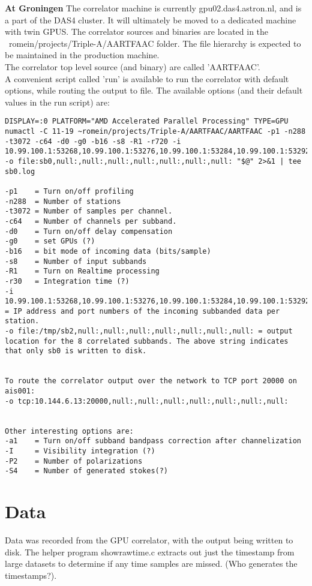 \documentclass {article}
\begin{document}
\textbf {At Groningen} The correlator machine is currently gpu02.das4.astron.nl,
and is a part  of the DAS4 cluster.  It will ultimately  be moved to a dedicated
machine with twin  GPUS. The correlator sources and binaries  are located in the
~romein/projects/Triple-A/AARTFAAC folder.  The file hierarchy is expected to be
maintained in  the production  machine.\\ The correlator  top level  source (and
binary) are called  'AARTFAAC'.\\ A convenient script called  'run' is available
to  run  the  correlator with  default  options,  while  routing the  output  to
file. The  available options (and  their default values in the run script) are:
\begin{verbatim}
DISPLAY=:0 PLATFORM="AMD Accelerated Parallel Processing" TYPE=GPU numactl -C 11-19 ~romein/projects/Triple-A/AARTFAAC/AARTFAAC -p1 -n288 -t3072 -c64 -d0 -g0 -b16 -s8 -R1 -r720 -i 10.99.100.1:53268,10.99.100.1:53276,10.99.100.1:53284,10.99.100.1:53292,10.99.100.1:53300,10.99.100.1:53308 -o file:sb0,null:,null:,null:,null:,null:,null:,null: "$@" 2>&1 | tee sb0.log

-p1    = Turn on/off profiling
-n288  = Number of stations
-t3072 = Number of samples per channel.
-c64   = Number of channels per subband.
-d0    = Turn on/off delay compensation
-g0    = set GPUs (?)
-b16   = bit mode of incoming data (bits/sample)
-s8    = Number of input subbands
-R1    = Turn on Realtime processing
-r30   = Integration time (?)
-i
10.99.100.1:53268,10.99.100.1:53276,10.99.100.1:53284,10.99.100.1:53292,10.99.100.1:53300,10.99.100.1:53308
= IP address and port numbers of the incoming subbanded data per station.
-o file:/tmp/sb2,null:,null:,null:,null:,null:,null:,null: = output location for the 8 correlated subbands. The above string indicates that only sb0 is written to disk. 


To route the correlator output over the network to TCP port 20000 on ais001:
-o tcp:10.144.6.13:20000,null:,null:,null:,null:,null:,null:,null:


Other interesting options are:
-a1    = Turn on/off subband bandpass correction after channelization
-I     = Visibility integration (?)
-P2    = Number of polarizations
-S4    = Number of generated stokes(?)
\end{verbatim}

\section {Data}
Data was recorded from the GPU correlator, with the output being written to
disk. The helper program showrawtime.c extracts out just the timestamp from
large datasets to determine if any time samples are missed. (Who generates the
timestamps?). 
\end{document}

